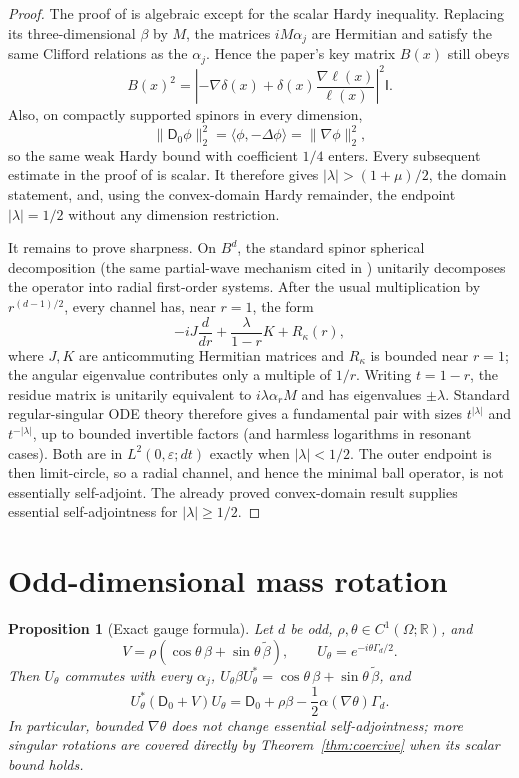 \documentclass[11pt]{article}
\newtheorem{proposition}[theorem]{Proposition}
\newcommand{\R}{\mathbb R}
\newcommand{\Id}{\mathsf I}
\newcommand{\Dzero}{\mathsf D_0}
\begin{document}
\begin{proof}
The proof of \cite[Theorem 4.3]{NNO} is algebraic except for the scalar Hardy
inequality.  Replacing its three-dimensional $\beta$ by $M$, the matrices
$iM\alpha_j$ are Hermitian and satisfy the same Clifford relations as the
$\alpha_j$.  Hence the paper's key matrix $B(x)$ still obeys
\[
 B(x)^2=\left| -\nabla\delta(x)
       +\delta(x)\frac{\nabla\ell(x)}{\ell(x)}\right|^2\Id.
\]
Also, on compactly supported spinors in every dimension,
\[
 \|\Dzero\phi\|_2^2=\langle\phi,-\Delta\phi\rangle
 =\|\nabla\phi\|_2^2,
\]
so the same weak Hardy bound with coefficient $1/4$ enters.  Every subsequent
estimate in the proof of \cite[Theorem 4.3]{NNO} is scalar.  It therefore gives
$|\lambda|>(1+\mu)/2$, the domain statement, and, using the convex-domain Hardy
remainder, the endpoint $|\lambda|=1/2$ without any dimension restriction.

It remains to prove sharpness.  On $B^d$, the standard spinor spherical
decomposition \cite[Chapter 4]{Thaller} (the same partial-wave mechanism cited
in \cite[Section 5]{NNO})
unitarily decomposes the operator into radial first-order systems.  After the
usual multiplication by $r^{(d-1)/2}$, every channel has, near $r=1$, the form
\[
 -iJ\frac d{dr}+\frac{\lambda}{1-r}K+R_\kappa(r),
\]
where $J,K$ are anticommuting Hermitian matrices and $R_\kappa$ is bounded near
$r=1$; the angular eigenvalue contributes only a multiple of $1/r$.
Writing $t=1-r$, the residue matrix is unitarily equivalent to
$i\lambda\alpha_rM$ and has eigenvalues $\pm\lambda$.  Standard
regular-singular ODE theory therefore gives a fundamental pair with sizes
$t^{|\lambda|}$ and $t^{-|\lambda|}$, up to bounded invertible factors (and
harmless logarithms in resonant cases).  Both are in $L^2(0,\varepsilon;dt)$
exactly when $|\lambda|<1/2$.  The outer endpoint is then limit-circle, so a
radial channel, and hence the minimal ball operator, is not essentially
self-adjoint.  The already proved convex-domain result supplies essential
self-adjointness for $|\lambda|\geq1/2$.
\end{proof}

\section{Odd-dimensional mass rotation}

\begin{proposition}[Exact gauge formula]\label{prop:gauge}
Let $d$ be odd, $\rho,\theta\in C^1(\Omega;\R)$, and
\[
 V=\rho(\cos\theta\,\beta+\sin\theta\,\widetilde\beta),
 \qquad U_\theta=e^{-i\theta\Gamma_d/2}.
\]
Then $U_\theta$ commutes with every $\alpha_j$,
$U_\theta\beta U_\theta^*=\cos\theta\,\beta+\sin\theta\,\widetilde\beta$, and
\begin{equation}\label{eq:gauge}
 U_\theta^*(\Dzero+V)U_\theta
 =\Dzero+\rho\beta-\frac12\alpha(\nabla\theta)\Gamma_d.
\end{equation}
In particular, bounded $\nabla\theta$ does not change essential
self-adjointness; more singular rotations are covered directly by
Theorem~\ref{thm:coercive} when its scalar bound holds.
\end{proposition}
\end{document}
